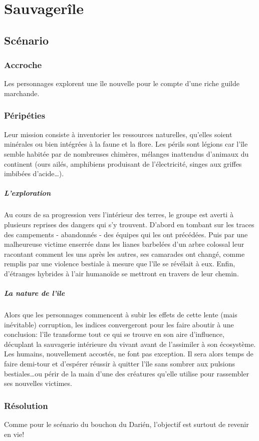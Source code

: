 \chapter{Sauvagerîle}

\section{Scénario}

\subsection{Accroche}

Les personnages explorent une île nouvelle pour le compte d'une riche guilde marchande.

\subsection{Péripéties}

Leur mission consiste à inventorier les ressources naturelles, qu'elles soient minérales ou bien intégrées à la faune et la flore.
Les périls sont légions car l'île semble habitée par de nombreuses chimères, mélanges inattendus d'animaux du continent (ours ailés, amphibiens produisant de l'électricité, singes aux griffes imbibées d'acide…).

\paragraph{L'exploration} Au cours de sa progression vers l'intérieur des terres, le groupe est averti à plusieurs reprises des dangers qui s'y trouvent.
D'abord en tombant sur les traces des campements - abandonnés - des équipes qui les ont précédées.
Puis par une malheureuse victime enserrée dans les lianes barbelées d'un arbre colossal leur racontant comment les uns après les autres, ses camarades ont changé, comme remplis par une violence bestiale à mesure que l'île se révélait à eux.
Enfin, d'étranges hybrides à l'air humanoïde se mettront en travers de leur chemin.

\paragraph{La nature de l'île} Alors que les personnages commencent à subir les effets de cette lente (mais inévitable) corruption, les indices convergeront pour les faire aboutir à une conclusion: l'île transforme tout ce qui se trouve en son aire d'influence, décuplant la sauvagerie intérieure du vivant avant de l'assimiler à son écosystème.
Les humains, nouvellement accostés, ne font pas exception.
Il sera alors temps de faire demi-tour et d'espérer réussir à quitter l'île sans sombrer aux pulsions bestiales\dots ou périr de la main d'une des créatures qu'elle utilise pour rassembler ses nouvelles victimes.

\subsection{Résolution}

Comme pour le scénario du bouchon du Darién, l'objectif est surtout de revenir en vie!

